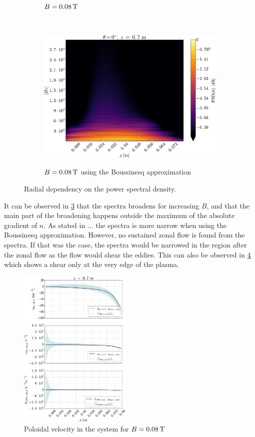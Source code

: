 \begin{figure}[htbp]
\begin{subfigure}[h]{0.45\textwidth}
        \label{fig:PSD2D008}
        \caption{$B=0.08\, \text{T}$}
    \end{subfigure}
    \\
    \begin{subfigure}[h]{0.45\textwidth}
        \centering
        \includegraphics[width=1.0\textwidth]{fig/results/zonal/PSD2D008B}
        \label{fig:PSD2D008B}
        \caption{$B=0.08\, \text{T}$ using the Boussinesq approximation}
    \end{subfigure}
    \caption{Radial dependency on the power spectral density.}
    \label{fig:PSD2D}
\end{figure}
%
It can be observed in \cref{fig:PSD2D} that the spectra broadens for increasing $B$, and that the main part of the broadening happens outside the maximum of the absolute gradient of $n$.
As stated in ...
the spectra is more narrow when using the Boussinesq approximation.
However, no sustained zonal flow is found from the spectra.
If that was the case, the spectra would be narrowed in the region after the zonal flow as the flow would shear the eddies.
This can also be observed in \cref{fig:zonalFlow0008} which shows a shear only at the very edge of the plasma.
%
\begin{figure}[htb]
    \centering
    \includegraphics[width=0.48\textwidth]{fig/results/zonal/zonalFlow0008}
    \caption{Poloidal velocity in the system for $B=0.08\, \text{T}$}
    \label{fig:zonalFlow0008}
\end{figure}
%
